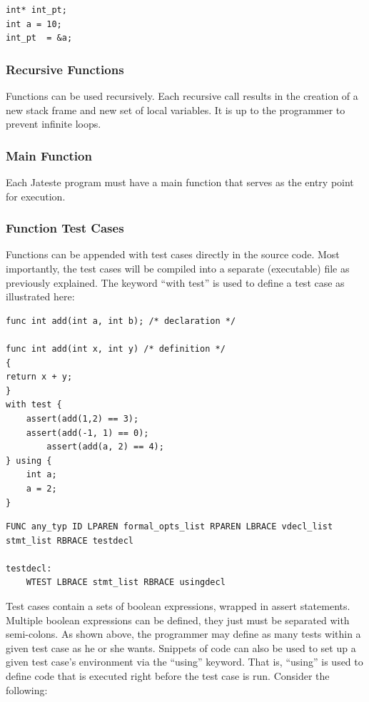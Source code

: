 \documentclass{article}
\begin{document}
\begin{lstlisting}
int* int_pt;
int a = 10;
int_pt  = &a;
\end{lstlisting}


\subsubsection{Recursive Functions}

Functions can be used recursively. Each recursive call results in the creation of a new stack frame and new set of local variables. It is up to the programmer to prevent infinite loops.


\subsubsection{Main Function}
Each Jateste program must have a main function that serves as the entry point for execution. 

\subsubsection{Function Test Cases}
Functions can be appended with test cases directly in the source code. Most importantly, the test cases will be compiled into a separate (executable) file as previously explained. The keyword ``with test'' is used to define a test case as illustrated here:

\begin{lstlisting}
func int add(int a, int b); /* declaration */

func int add(int x, int y) /* definition */
{
return x + y;
}
with test {
	assert(add(1,2) == 3);
	assert(add(-1, 1) == 0);
		assert(add(a, 2) == 4);
} using {
    int a;
    a = 2;
}
\end{lstlisting}


\begin{Verbatim}[frame=single]
FUNC any_typ ID LPAREN formal_opts_list RPAREN LBRACE vdecl_list stmt_list RBRACE testdecl 

testdecl:
	WTEST LBRACE stmt_list RBRACE usingdecl
\end{Verbatim}

Test cases contain a sets of boolean expressions, wrapped in assert statements. Multiple boolean expressions can be defined, they just must be separated with semi-colons. As shown above, the programmer may define as many tests within a given test case as he or she wants.
Snippets of code can also be used to set up a given test case's environment via the ``using'' keyword. That is, ``using'' is used to define code that is executed right before the test case is run. Consider the following:
\end{document}
